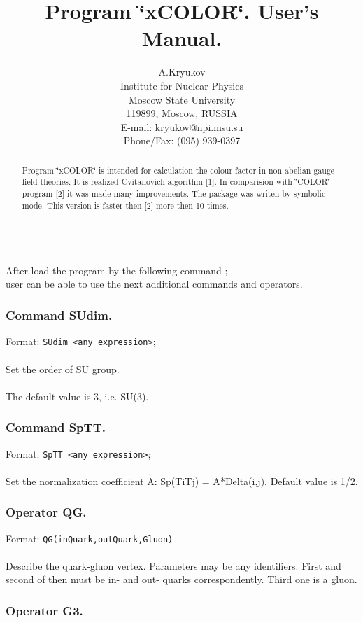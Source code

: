\documentclass{article}
\title{Program \char`\"{}xCOLOR\char`\"{}. User's Manual.}
\author{A.Kryukov \\
	Institute for Nuclear Physics \\
	Moscow State University \\
	119899, Moscow, RUSSIA \\
 	E-mail: kryukov@npi.msu.su \\
	Phone/Fax: (095) 939-0397}
\date{}
\begin{document}
\maketitle

\begin{abstract}
Program \char`\"{}xCOLOR\char`\"{} is intended for calculation the colour
factor in non-abelian gauge field theories. It is 
realized Cvitanovich algorithm {[}1{]}. In comparision with
\char`\"{}COLOR\char`\"{} program {[}2{]} it was made many improvements.
The package was writen by symbolic mode. This version is
faster then {[}2{]} more then 10 times.
\end{abstract} 

\ \\
After load the program by the following command ; \\
user can be able to use the next additional commands and operators. 

\subsubsection*{Command SUdim.}

Format: {\tt SUdim <any expression>}; \\
\ \\
Set the order of SU group. \\
\ \\
The default value is 3, i.e. SU(3). 

\subsubsection*{Command SpTT.}

Format: {\tt SpTT <any expression>}; \\
\ \\
Set the normalization coefficient A: Sp(TiTj) = A{*}Delta(i,j).
Default value is 1/2. 

\subsubsection*{Operator QG.}

Format: {\tt QG(inQuark,outQuark,Gluon)} \\
\ \\
Describe the quark-gluon vertex. Parameters may be any identifiers.
First and second of then must be in- and out- quarks correspondently.
Third one is a gluon. 

\subsubsection*{Operator G3.}
\end{document}
